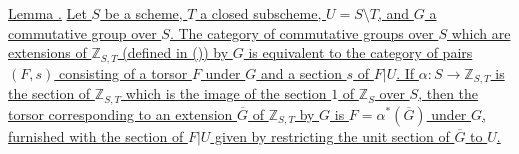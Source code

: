 \medskip
\noindent\underline{Lemma .}  \underline{Let $S$ be a scheme, $T$ a
closed subscheme, $U=S\setminus T$, and $G$ a commutative group over $S$.
The category of commutative groups over $S$ which are extensions of
$\mathbb Z_{S,T}$ (defined in ()) by $G$ is equivalent to the category of
pairs $(F,s)$ consisting of a torsor $F$ under $G$ and a section $s$ of
$F|U$.  If $\alpha:S\to\mathbb Z_{S,T}$ is the section of
$\mathbb Z_{S,T}$ which is the image of the section $1$ of $\mathbb Z_S$
over $S$, then the torsor corresponding to an extension $\overline G$ of
$\mathbb Z_{S,T}$ by $G$ is $F=\alpha^*(\overline G)$ under $G$, furnished
with the section of $F|U$ given by restricting the unit section of
$\overline G$ to $U$.}

